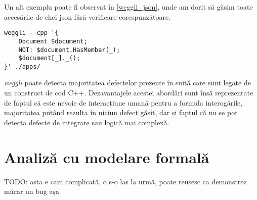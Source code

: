 Un alt exemplu poate fi observat în \ref{weggli_json}, unde am dorit să găsim toate accesările de chei \acrshort{json} fără verificare corespunzătoare.

\begin{lstlisting}[label={weggli_json}, caption={Interogare weggli pentru a găsi accesarea de chei JSON fără verificare}]
weggli --cpp '{ 
    Document $document;
    NOT: $document.HasMember(_);
    $document[_]._();
}' ./apps/
\end{lstlisting}

\textit{weggli} poate detecta majoritatea defectelor prezente în suită care sunt legate de un construct de cod C++. Dezavantajele acestei abordări sunt însă reprezentate de faptul că este nevoie de interacțiune umană pentru a formula interogările, majoritatea putând rezulta în niciun defect găsit, dar și faptul că nu se pot detecta defecte de integrare sau logică mai complexă.




\section{Analiză cu modelare formală}

TODO: asta e cam complicată, o s-o las la urmă, poate reușesc ca demonstrez măcar un bug așa

